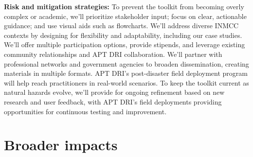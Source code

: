 \documentclass[11pt]{article}
\begin{document}
\textbf{Risk and mitigation strategies:}  
To prevent the toolkit from becoming overly complex or academic, we’ll prioritize stakeholder input; focus on clear, actionable guidance; and use visual aids such as flowcharts. 
We’ll address diverse INMCC contexts by designing for flexibility and adaptability, including our case studies. 
We’ll offer multiple participation options, provide stipends, and leverage existing community relationships and APT DRI collaboration. 
We’ll partner with professional networks and government agencies to broaden dissemination, creating materials in multiple formats. 
APT DRI’s post-disaster field deployment program will help reach practitioners in real-world scenarios. 
To keep the toolkit current as natural hazards evolve, we’ll provide for ongoing refinement based on new research and user feedback, with APT DRI’s field deployments providing opportunities for continuous testing and improvement.

\section{Broader impacts}
\vspace{-0.5cm}
\end{document}
